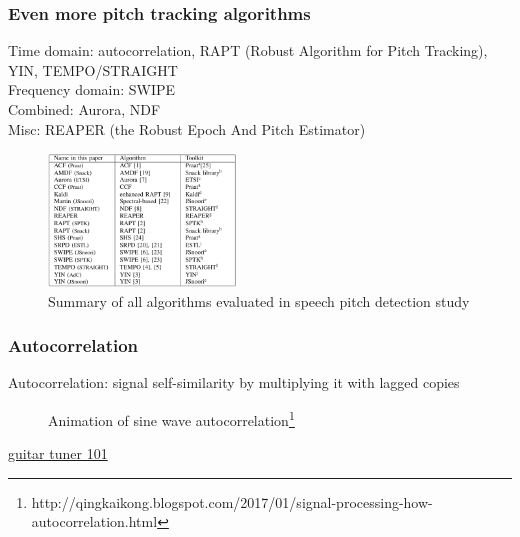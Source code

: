 \documentclass{beamer}
\begin{document}
\begin{frame}
	\frametitle{Even more pitch tracking algorithms}
	Time domain: autocorrelation, RAPT (Robust Algorithm for Pitch Tracking), YIN, TEMPO/STRAIGHT\\
	Frequency domain: SWIPE\\
	Combined: Aurora, NDF\\
	Misc: REAPER (the Robust Epoch And Pitch Estimator)\\
	\begin{figure}
		\includegraphics[width=5cm]{./pitchtable.png}
		\caption{Summary of all algorithms evaluated in speech pitch detection study}
	\end{figure}
\end{frame}

\begin{frame}
	\frametitle{Autocorrelation}
	Autocorrelation: signal self-similarity by multiplying it with lagged copies
	\begin{figure}
		\caption{Animation of sine wave autocorrelation\footnote{http://qingkaikong.blogspot.com/2017/01/signal-processing-how-autocorrelation.html}}
		\vspace{-1em}
	\end{figure}
	\href{https://dsp.stackexchange.com/questions/19379/improving-an-auto-correlation-based-guitar-pitch-detector}{guitar tuner 101}
\end{frame}

\end{document}
